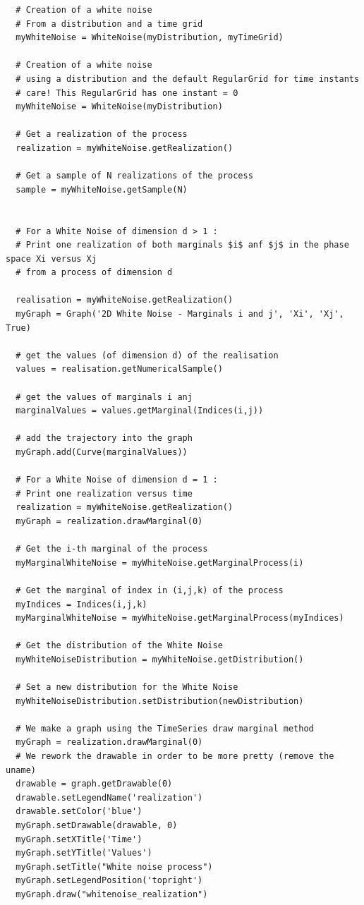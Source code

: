 \begin{lstlisting}
  # Creation of a white noise
  # From a distribution and a time grid
  myWhiteNoise = WhiteNoise(myDistribution, myTimeGrid)

  # Creation of a white noise
  # using a distribution and the default RegularGrid for time instants
  # care! This RegularGrid has one instant = 0
  myWhiteNoise = WhiteNoise(myDistribution)

  # Get a realization of the process
  realization = myWhiteNoise.getRealization()

  # Get a sample of N realizations of the process
  sample = myWhiteNoise.getSample(N)

  
  # For a White Noise of dimension d > 1 : 
  # Print one realization of both marginals $i$ anf $j$ in the phase space Xi versus Xj
  # from a process of dimension d 

  realisation = myWhiteNoise.getRealization()
  myGraph = Graph('2D White Noise - Marginals i and j', 'Xi', 'Xj', True)

  # get the values (of dimension d) of the realisation
  values = realisation.getNumericalSample()

  # get the values of marginals i anj
  marginalValues = values.getMarginal(Indices(i,j))

  # add the trajectory into the graph 
  myGraph.add(Curve(marginalValues))

  # For a White Noise of dimension d = 1 : 
  # Print one realization versus time
  realization = myWhiteNoise.getRealization()
  myGraph = realization.drawMarginal(0)
  
  # Get the i-th marginal of the process
  myMarginalWhiteNoise = myWhiteNoise.getMarginalProcess(i)

  # Get the marginal of index in (i,j,k) of the process   
  myIndices = Indices(i,j,k)
  myMarginalWhiteNoise = myWhiteNoise.getMarginalProcess(myIndices)

  # Get the distribution of the White Noise
  myWhiteNoiseDistribution = myWhiteNoise.getDistribution()

  # Set a new distribution for the White Noise
  myWhiteNoiseDistribution.setDistribution(newDistribution)

  # We make a graph using the TimeSeries draw marginal method
  myGraph = realization.drawMarginal(0)
  # We rework the drawable in order to be more pretty (remove the uname)
  drawable = graph.getDrawable(0)
  drawable.setLegendName('realization')
  drawable.setColor('blue')
  myGraph.setDrawable(drawable, 0)
  myGraph.setXTitle('Time')
  myGraph.setYTitle('Values')
  myGraph.setTitle("White noise process")
  myGraph.setLegendPosition('topright')
  myGraph.draw("whitenoise_realization")


\end{lstlisting}
